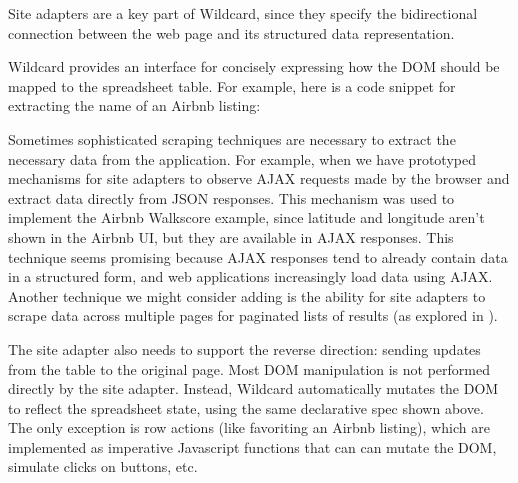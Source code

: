 \documentclass[english,submission]{programming}
\newenvironment{Shaded}{}{}
\newcommand{\CommentTok}[1]{\textcolor[rgb]{0.38,0.63,0.69}{\textit{#1}}}
\newcommand{\FunctionTok}[1]{\textcolor[rgb]{0.02,0.16,0.49}{#1}}
\newcommand{\KeywordTok}[1]{\textcolor[rgb]{0.00,0.44,0.13}{\textbf{#1}}}
\newcommand{\NormalTok}[1]{#1}
\newcommand{\OperatorTok}[1]{\textcolor[rgb]{0.40,0.40,0.40}{#1}}
\newcommand{\SpecialCharTok}[1]{\textcolor[rgb]{0.25,0.44,0.63}{#1}}
\newcommand{\StringTok}[1]{\textcolor[rgb]{0.25,0.44,0.63}{#1}}
\newcommand{\VariableTok}[1]{\textcolor[rgb]{0.10,0.09,0.49}{#1}}
\newcommand{\VerbatimStringTok}[1]{\textcolor[rgb]{0.25,0.44,0.63}{#1}}
\begin{document}
Site adapters are a key part of Wildcard, since they specify the
bidirectional connection between the web page and its structured data
representation.

Wildcard provides an interface for concisely expressing how the DOM
should be mapped to the spreadsheet table. For example, here is a code
snippet for extracting the name of an Airbnb listing:

\begin{Shaded}
\end{Shaded}

Sometimes sophisticated scraping techniques are necessary to extract the
necessary data from the application. For example, when we have
prototyped mechanisms for site adapters to observe AJAX requests made by
the browser and extract data directly from JSON responses. This
mechanism was used to implement the Airbnb Walkscore example, since
latitude and longitude aren't shown in the Airbnb UI, but they are
available in AJAX responses. This technique seems promising because AJAX
responses tend to already contain data in a structured form, and web
applications increasingly load data using AJAX. Another technique we
might consider adding is the ability for site adapters to scrape data
across multiple pages for paginated lists of results (as explored in
\autocite{huynh2006}).

The site adapter also needs to support the reverse direction: sending
updates from the table to the original page. Most DOM manipulation is
not performed directly by the site adapter. Instead, Wildcard
automatically mutates the DOM to reflect the spreadsheet state, using
the same declarative spec shown above. The only exception is row actions
(like favoriting an Airbnb listing), which are implemented as imperative
Javascript functions that can can mutate the DOM, simulate clicks on
buttons, etc.
\end{document}

